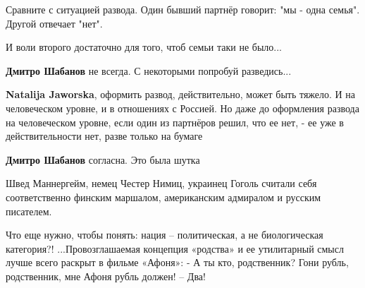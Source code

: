 \begin{itemize}
Сравните с ситуацией развода. Один бывший партнёр говорит: "мы - одна семья".
Другой отвечает "нет".

И воли второго достаточно для того, чтоб семьи таки не было...

\begin{itemize}
 
\textbf{Дмитро Шабанов} не всегда.
С некоторыми попробуй разведись...

 
\textbf{Natalija Jaworska}, оформить развод, действительно, может быть тяжело. И на человеческом уровне, и в отношениях с Россией. Но даже до оформления развода на человеческом уровне, если один из партнёров решил, что ее нет, - ее уже в действительности нет, разве только на бумаге

 
\textbf{Дмитро Шабанов} согласна.
Это была шутка
\end{itemize}

 

Швед Маннергейм, немец Честер Нимиц, украинец Гоголь считали себя
соответственно финским маршалом, американским адмиралом и русским писателем.

Что еще нужно, чтобы понять: нация – политическая, а не биологическая
категория?! ...Провозглашаемая концепция «родства» и ее утилитарный смысл лучше
всего раскрыт в фильме «Афоня»: - А ты кто, родственник? Гони рубль,
родственник, мне Афоня рубль должен! – Два!

\begin{itemize}
 

\end{itemize}
\end{itemize}
